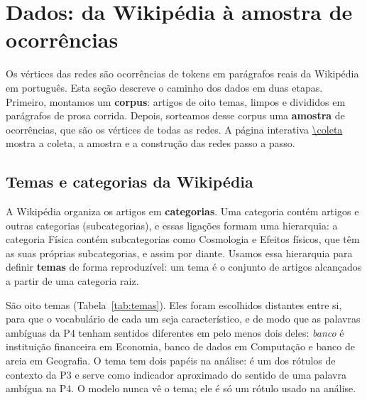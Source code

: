 \section{Dados: da Wikipédia à amostra de ocorrências}\label{sec:dados}

Os vértices das redes são ocorrências de tokens em parágrafos reais da Wikipédia em
português. Esta seção descreve o caminho dos dados em duas etapas. Primeiro, montamos um
\textbf{corpus}: \nArtigos{} artigos de oito temas, limpos e divididos em \nParagrafos{}
parágrafos de prosa corrida. Depois, sorteamos desse corpus uma \textbf{amostra} de
\nVertices{} ocorrências, que são os vértices de todas as redes. A página interativa
\url{\coleta} mostra a coleta, a amostra e a construção das redes passo a passo.

\subsection{Temas e categorias da Wikipédia}\label{sec:temas}

A Wikipédia organiza os artigos em \textbf{categorias}. Uma categoria contém artigos e outras
categorias (subcategorias), e essas ligações formam uma hierarquia: a categoria Física contém
subcategorias como Cosmologia e Efeitos físicos, que têm as suas próprias subcategorias, e
assim por diante. Usamos essa hierarquia
para definir \textbf{temas} de forma reproduzível: um tema é o conjunto de artigos alcançados
a partir de uma categoria raiz.

São oito temas (Tabela~\ref{tab:temas}). Eles foram escolhidos distantes entre si, para que o
vocabulário de cada um seja característico, e de modo que as palavras ambíguas da P4 tenham
sentidos diferentes em pelo menos dois deles: \emph{banco} é instituição financeira em
Economia, banco de dados em Computação e banco de areia em Geografia. O tema tem dois papéis
na análise: é um dos rótulos de contexto da P3 e serve como indicador aproximado do sentido de
uma palavra ambígua na P4. O modelo nunca vê o tema; ele é só um rótulo usado na análise.

